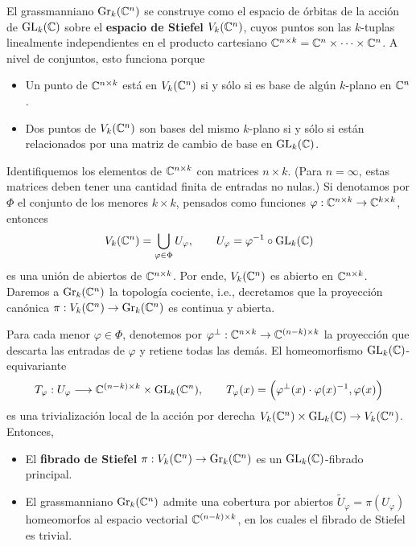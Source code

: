 El grassmanniano $\operatorname{Gr}_k(\mathbb C^n)$ se construye como el espacio de órbitas de la acción de $\operatorname{GL}_k(\mathbb C)$ sobre el \textbf{espacio de Stiefel} $V_k(\mathbb C^n)$, cuyos puntos son las $k$-tuplas linealmente independientes en el producto cartesiano $\mathbb C^{n \times k} = \mathbb C^n \times \dots \times \mathbb C^n$. A nivel de conjuntos, esto funciona porque
\begin{itemize}
    \itemsep 0em
    \item Un punto de $\mathbb C^{n \times k}$ está en $V_k(\mathbb C^n)$ si y sólo si es base de algún $k$-plano en $\mathbb C^n$.
    \item Dos puntos de $V_k(\mathbb C^n)$ son bases del mismo $k$-plano si y sólo si están relacionados por una matriz de cambio de base en $\operatorname{GL}_k(\mathbb C)$.
\end{itemize}

Identifiquemos los elementos de $\mathbb C^{n \times k}$ con matrices $n \times k$. (Para $n = \infty$, estas matrices deben tener una cantidad finita de entradas no nulas.) Si denotamos por $\Phi$ el conjunto de los menores $k \times k$, pensados como funciones $\varphi : \mathbb C^{n \times k} \to \mathbb C^{k \times k}$, entonces
$$V_k(\mathbb C^n) = \bigcup_{\varphi \in \Phi} U_\varphi, \qquad U_\varphi = \varphi^{-1} \circ \operatorname{GL}_k(\mathbb C)$$
es una unión de abiertos de $\mathbb C^{n \times k}$. Por ende, $V_k(\mathbb C^n)$ es abierto en $\mathbb C^{n \times k}$. Daremos a $\operatorname{Gr}_k(\mathbb C^n)$ la topología cociente, i.e., decretamos que la proyección canónica $\pi : V_k(\mathbb C^n) \to \operatorname{Gr}_k(\mathbb C^n)$ es continua y abierta.

Para cada menor $\varphi \in \Phi$, denotemos por $\varphi^\perp : \mathbb C^{n \times k} \to \mathbb C^{(n-k) \times k}$ la proyección que descarta las entradas de $\varphi$ y retiene todas las demás. El homeomorfismo $\operatorname{GL}_k(\mathbb C)$-equivariante
$$
T_\varphi : U_\varphi \longrightarrow \mathbb C^{(n-k) \times k} \times \operatorname{GL}_k(\mathbb C^n), \qquad
T_\varphi(x) = \Big( \varphi^\perp(x) \cdot \varphi(x)^{-1}, \varphi(x) \Big)
$$
es una trivialización local de la acción por derecha $V_k(\mathbb C^n) \times \operatorname{GL}_k(\mathbb C) \to V_k(\mathbb C^n)$. Entonces,
\begin{itemize}
    \itemsep 0em
    \item El \textbf{fibrado de Stiefel} $\pi : V_k(\mathbb C^n) \to \operatorname{Gr}_k(\mathbb C^n)$ es un $\operatorname{GL}_k(\mathbb C)$-fibrado principal.
    \item El grassmanniano $\operatorname{Gr}_k(\mathbb C^n)$ admite una cobertura por abiertos $\widetilde U_\varphi = \pi(U_\varphi)$ homeomorfos al espacio vectorial $\mathbb C^{(n-k) \times k}$, en los cuales el fibrado de Stiefel es trivial.
\end{itemize}

